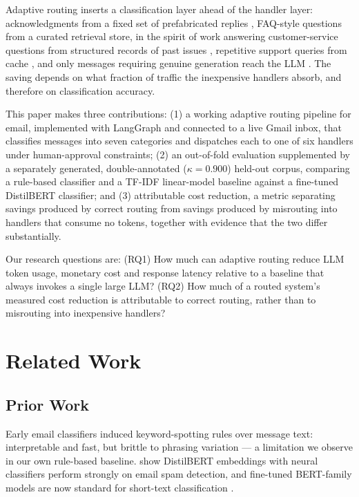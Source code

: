 \documentclass[conference]{IEEEtran}
\begin{document}
Adaptive routing inserts a classification layer ahead of the handler layer: acknowledgments from a fixed set of prefabricated replies \cite{b3}, FAQ-style questions from a curated retrieval store, in the spirit of work answering customer-service questions from structured records of past issues \cite{b4}, repetitive support queries from cache \cite{b5}, and only messages requiring genuine generation reach the LLM \cite{b6}\cite{b7}. The saving depends on what fraction of traffic the inexpensive handlers absorb, and therefore on classification accuracy.

This paper makes three contributions: (1) a working adaptive routing pipeline for email, implemented with LangGraph \cite{b8} and connected to a live Gmail inbox, that classifies messages into seven categories and dispatches each to one of six handlers under human-approval constraints; (2) an out-of-fold evaluation supplemented by a separately generated, double-annotated ($\kappa = 0.900$) held-out corpus, comparing a rule-based classifier and a TF-IDF linear-model baseline against a fine-tuned DistilBERT \cite{b9} classifier; and (3) attributable cost reduction, a metric separating savings produced by correct routing from savings produced by misrouting into handlers that consume no tokens, together with evidence that the two differ substantially.

Our research questions are: (RQ1) How much can adaptive routing reduce LLM token usage, monetary cost and response latency relative to a baseline that always invokes a single large LLM? (RQ2) How much of a routed system's measured cost reduction is attributable to correct routing, rather than to misrouting into inexpensive handlers?

\section{Related Work}

\subsection{Prior Work}
Early email classifiers induced keyword-spotting rules over message text\cite{b10}: interpretable and fast, but brittle to phrasing variation --- a limitation we observe in our own rule-based baseline. \cite{b11} show DistilBERT embeddings with neural classifiers perform strongly on email spam detection, and fine-tuned BERT-family models are now standard for short-text classification \cite{b12}\cite{b13}.
\end{document}
